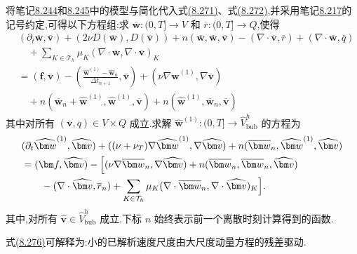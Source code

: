 \begin{note}
\label{note:vms-bubble-time-dependent-method}
将笔记\hyperref[note:vms-bubble-pressure-model]{8.244}和\hyperref[note:vms-bubble-further-simplifications]{8.245}中的模型与简化代入式\hyperref[eq:vms-bubble-large-scale-splitting]{(8.271)}、式\hyperref[eq:vms-bubble-small-scale-splitting]{(8.272)},并采用笔记\hyperref[note:vms-notation]{8.217}的记号约定,可得以下方程组:求 $\overline{\bm w}:(0,T]\to V$ 和 $\overline r:(0,T]\to Q$,使得
\begin{equation}\label{eq:vms-bubble-large-scale-method}
\begin{aligned}
 &(\partial_t\overline{\bm w},\overline{\bm v})
 +(2\nu D(\overline{\bm w}),D(\overline{\bm v}))
 +n(\overline{\bm w},\overline{\bm w},\overline{\bm v})
 -(\nabla\cdot\overline{\bm v},\overline r)
 +(\nabla\cdot\overline{\bm w},\overline q)\\
 &\quad+\sum_{K\in\mathcal T_h}
   \mu_K(\nabla\cdot\overline{\bm w},
                \nabla\cdot\overline{\bm v})_K\\
 &=(\bm f,\overline{\bm v})
   -\left(\frac{\widehat{\bm w}^{(1)}-\widehat{\bm w}_n}
                  {\Delta t_{n+1}},\overline{\bm v}\right)
   +(\nu\nabla\widehat{\bm w}^{(1)},\nabla\overline{\bm v})\\
 &\quad+n(\overline{\bm w}_n+\widehat{\bm w}^{(1)},
          \widehat{\bm w}^{(1)},\overline{\bm v})
   +n(\widehat{\bm w}^{(1)},\overline{\bm w}_n,
          \overline{\bm v})
\end{aligned}
\end{equation}
其中对所有 $(\overline{\bm v},\overline q)\in V\times Q$ 成立.求解 $\widehat{\bm w}^{(1)}:(0,T]\to\widehat V^h_{\mathrm{bub}}$ 的方程为
\begin{equation}\label{eq:vms-bubble-small-scale-method}
\begin{aligned}
 &(\partial_t\widehat{\bm w}^{(1)},\widehat{\bm v})
 +((\nu+\nu_T)\nabla\widehat{\bm w}^{(1)},
                       \nabla\widehat{\bm v})
 +n(\overline{\bm w}_n,\widehat{\bm w}^{(1)},
                       \widehat{\bm v})\\
 &=(\bm f,\widehat{\bm v})
   -\Bigl[(\nu\nabla\overline{\bm w}_n,
                         \nabla\widehat{\bm v})
   +n(\overline{\bm w}_n,\overline{\bm w}_n,
                         \widehat{\bm v})\\
 &\qquad-(\nabla\cdot\widehat{\bm v},\overline r_n)
   +\sum_{K\in\mathcal T_h}\mu_K(\nabla\cdot\overline{\bm w}_n,
                      \nabla\cdot\widehat{\bm v})_K\Bigr].
\end{aligned}
\end{equation}
其中,对所有 $\widehat{\bm v}\in\widehat V^h_{\mathrm{bub}}$ 成立.下标 $n$ 始终表示前一个离散时刻计算得到的函数.

式\hyperref[eq:vms-bubble-small-scale-method]{(8.276)}可解释为:小的已解析速度尺度由大尺度动量方程的残差驱动.
\end{note}


